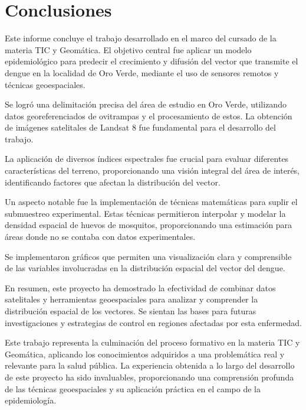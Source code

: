 \section{Conclusiones}

Este informe concluye el trabajo desarrollado en el marco del cursado de la materia TIC y Geomática. El objetivo central fue aplicar un modelo epidemiológico para predecir el crecimiento y difusión del vector que transmite el dengue en la localidad de Oro Verde, mediante el uso de sensores remotos y técnicas geoespaciales.

Se logró una delimitación precisa del área de estudio en Oro Verde, utilizando datos georeferenciados de ovitrampas y el procesamiento de estos. La obtención de imágenes satelitales de Landsat 8 fue fundamental para el desarrollo del trabajo.

La aplicación de diversos índices espectrales fue crucial para evaluar diferentes características del terreno, proporcionando una visión integral del área de interés, identificando factores que afectan la distribución del vector.

Un aspecto notable fue la implementación de técnicas matemáticas para suplir el submuestreo experimental. Estas técnicas permitieron interpolar y modelar la densidad espacial de huevos de mosquitos, proporcionando una estimación para áreas donde no se contaba con datos experimentales.

Se implementaron gráficos que permiten una visualización clara y comprensible de las variables involucradas en la distribución espacial del vector del dengue.

En resumen, este proyecto ha demostrado la efectividad de combinar datos satelitales y herramientas geoespaciales para analizar y comprender la distribución espacial de los vectores. Se sientan las bases para futuras investigaciones y estrategias de control en regiones afectadas por esta enfermedad.

Este trabajo representa la culminación del proceso formativo en la materia TIC y Geomática, aplicando los conocimientos adquiridos a una problemática real y relevante para la salud pública. La experiencia obtenida a lo largo del desarrollo de este proyecto ha sido invaluables, proporcionando una comprensión profunda de las técnicas geoespaciales y su aplicación práctica en el campo de la epidemiología.